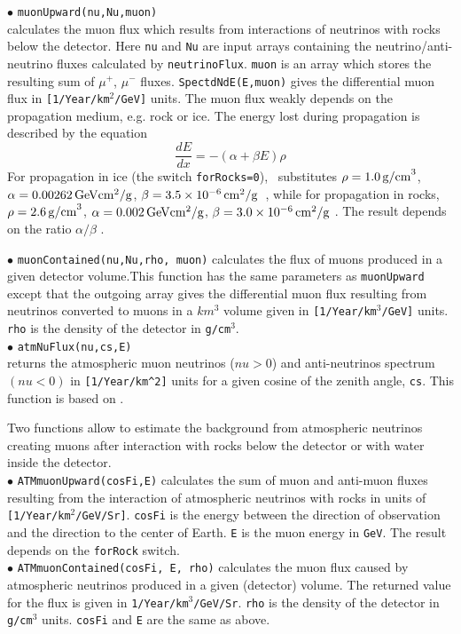 \documentclass[12pt,a4paper]{article}
\begin{document}
\noindent
$\bullet$ \verb|muonUpward(nu,Nu,muon)|\\
calculates the muon flux which results from interactions of
neutrinos with rocks below the detector. Here  {\tt nu} and {\tt Nu} are input arrays containing the
neutrino/anti-neutrino fluxes calculated by {\tt neutrinoFlux}. {\tt muon} is an
array which stores the resulting sum of $\mu^+$, $\mu^-$ fluxes. {\tt SpectdNdE(E,muon)}  gives the
differential muon flux  in \verb|[1/Year/km|$^2$\verb|/GeV]| units.  
The muon flux weakly depends on the propagation medium, e.g. rock or ice. The energy lost during
propagation is described by  the equation  \cite{Erkoca:2009by}
\begin{equation}
\frac{dE}{dx}=-(\alpha +\beta E)\rho 
\end{equation}
For propagation in ice (the switch {\tt forRocks=0}),
 \micro\ substitutes 
$\rho= 1.0{\rm \, g/cm}^3$, $\alpha=0.00262 {\rm \, GeV} {\rm cm}^2/{\rm g}$,  $\beta=3.5\times 10^{-6} {\rm \, cm}^2/{\rm g}$~\cite{Chirkin:2004hz}, while
for propagation in rocks, 
$\rho= 2.6{\rm \, g/cm}^3$, $\alpha=0.002 {\rm \, GeV} {\rm cm}^2/{\rm g}$,  $\beta=3.0\times 10^{-6} {\rm \, cm}^2/{\rm g}$ \cite{Erkoca:2009by}. 
The result depends on the ratio $\alpha/\beta$ .

\noindent $\bullet$ \verb|muonContained(nu,Nu,rho, muon)|
calculates  the flux  of muons  produced in a given detector volume.This function  has the same parameters as \verb|muonUpward| 
except that the  outgoing  array gives the differential muon flux resulting from neutrinos converted to muons 
in a  $km^3$ volume given  in \verb|[1/Year/km|$^3$\verb|/GeV]| units.  \verb|rho| is the density of the detector in 
\verb|g/cm|$^3$.\\


\noindent $\bullet$ \verb|atmNuFlux(nu,cs,E)|\\
returns the atmospheric  muon neutrinos ($nu>0$) and anti-neutrinos spectrum
$(nu<0)$ in \verb|[1/Year/km^2]| units for a given cosine of the zenith angle, \verb|cs|. This function is  based on
\cite{Honda:2006qj}.   


Two functions allow to estimate the background from atmospheric neutrinos creating muons after interaction  with rocks below the detector  or with water inside the detector.\\
\noindent $\bullet$  \verb|ATMmuonUpward(cosFi,E)| calculates the sum of  muon
and anti-muon fluxes resulting from the
interaction of  atmospheric  neutrinos with rocks in units of  
\verb|[1/Year/km|$^2$\verb|/GeV/Sr]|. \verb|cosFi|  is the energy between the direction of
observation and the direction to the center of Earth. \verb|E|  is the  muon energy in
{\tt GeV}. The  result depends on  the {\tt forRock} switch. \\
\noindent $\bullet$  \verb|ATMmuonContained(cosFi, E, rho)| calculates the muon flux
caused by atmospheric  neutrinos  produced in a given (detector)
volume. The returned value for the flux is given in
\verb|1/Year/km|$^3$\verb|/GeV/Sr|. {\tt rho} is
the density of the detector in \verb|g/cm|$^3$ units. {\tt cosFi} and {\tt E} are the
same as above. 
\end{document}

